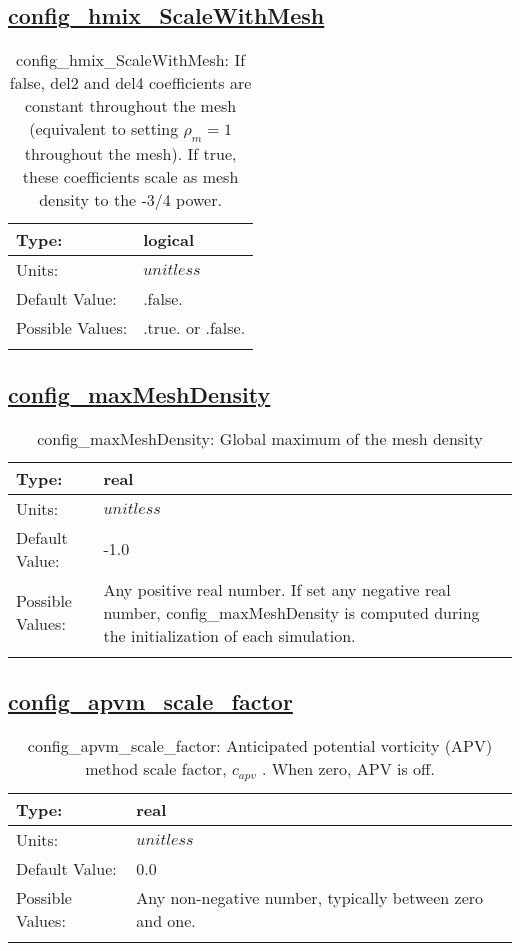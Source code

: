 \subsection[config\_hmix\_ScaleWithMesh]{\hyperref[sec:nm_tab_hmix]{config\_hmix\_ScaleWithMesh}}
\label{subsec:nm_sec_config_hmix_ScaleWithMesh}
\begin{center}
\begin{longtable}{| p{2.0in} | p{4.0in} |}
    \hline
    Type: & logical \\
    \hline
    Units: & $unitless$ \\
    \hline
    Default Value: & .false. \\
    \hline
    Possible Values: & .true. or .false. \\
    \hline
    \caption{config\_hmix\_ScaleWithMesh:  If false, del2 and del4 coefficients are constant throughout the mesh (equivalent to setting  $\rho_m=1$  throughout the mesh).  If true, these coefficients scale as mesh density to the -3/4 power.}
\end{longtable}
\end{center}
\subsection[config\_maxMeshDensity]{\hyperref[sec:nm_tab_hmix]{config\_maxMeshDensity}}
\label{subsec:nm_sec_config_maxMeshDensity}
\begin{center}
\begin{longtable}{| p{2.0in} | p{4.0in} |}
    \hline
    Type: & real \\
    \hline
    Units: & $unitless$ \\
    \hline
    Default Value: & -1.0 \\
    \hline
    Possible Values: & Any positive real number. If set any negative real number, config\_maxMeshDensity is computed during the initialization of each simulation. \\
    \hline
    \caption{config\_maxMeshDensity: Global maximum of the mesh density}
\end{longtable}
\end{center}
\subsection[config\_apvm\_scale\_factor]{\hyperref[sec:nm_tab_hmix]{config\_apvm\_scale\_factor}}
\label{subsec:nm_sec_config_apvm_scale_factor}
\begin{center}
\begin{longtable}{| p{2.0in} | p{4.0in} |}
    \hline
    Type: & real \\
    \hline
    Units: & $unitless$ \\
    \hline
    Default Value: & 0.0 \\
    \hline
    Possible Values: & Any non-negative number, typically between zero and one. \\
    \hline
    \caption{config\_apvm\_scale\_factor:  Anticipated potential vorticity (APV) method scale factor,  $c_{apv}$ .  When zero, APV is off.}
\end{longtable}
\end{center}

